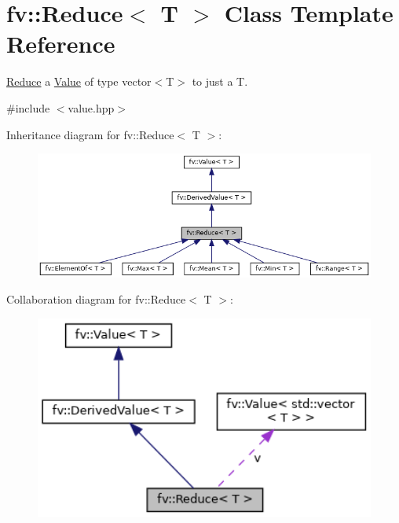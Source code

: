 \hypertarget{classfv_1_1Reduce}{}\section{fv\+:\+:Reduce$<$ T $>$ Class Template Reference}
\label{classfv_1_1Reduce}


\hyperlink{classfv_1_1Reduce}{Reduce} a \hyperlink{classfv_1_1Value}{Value} of type vector$<$\+T$>$ to just a T.  




{\ttfamily \#include $<$value.\+hpp$>$}



Inheritance diagram for fv\+:\+:Reduce$<$ T $>$\+:
\nopagebreak
\begin{figure}[H]
\begin{center}
\leavevmode
\includegraphics[width=350pt]{classfv_1_1Reduce__inherit__graph}
\end{center}
\end{figure}


Collaboration diagram for fv\+:\+:Reduce$<$ T $>$\+:
\nopagebreak
\begin{figure}[H]
\begin{center}
\leavevmode
\includegraphics[width=350pt]{classfv_1_1Reduce__coll__graph}
\end{center}
\end{figure}
